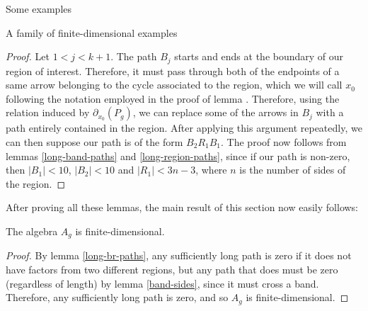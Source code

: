 \begin{chapter}{Some examples}
\begin{section}{A family of finite-dimensional examples}
\begin{proof}
Let $1<j<k+1$. The path $B_j$ starts and ends at the boundary of our region of interest. Therefore, it must pass through both of the endpoints of a same arrow belonging to the cycle associated to the region, which we will call $x_0$ following the notation employed in the proof of lemma \label{long-band-paths}. Therefore, using the relation induced by $\partial_{x_0}(P_g)$, we can replace some of the arrows in $B_j$ with a path entirely contained in the region.
After applying this argument repeatedly, we can then suppose our path is of the form $B_2 R_1 B_1$. The proof now follows from lemmas \ref{long-band-paths} and \ref{long-region-paths}, since if our path is non-zero, then $|B_1|<10$, $|B_2|<10$ and $|R_1|<3n-3$, where $n$ is the number of sides of the region.
\end{proof}

After proving all these lemmas, the main result of this section now easily follows:

\begin{thm} The algebra $A_g$ is finite-dimensional.
\end{thm}
\begin{proof} By lemma \ref{long-br-paths}, any sufficiently long path is zero if it does not have factors from two different regions, but any path that does must be zero (regardless of length) by lemma \ref{band-sides}, since it must cross a band. Therefore, any sufficiently long path is zero, and so $A_g$ is finite-dimensional.
\end{proof}
\end{section}
\end{chapter}